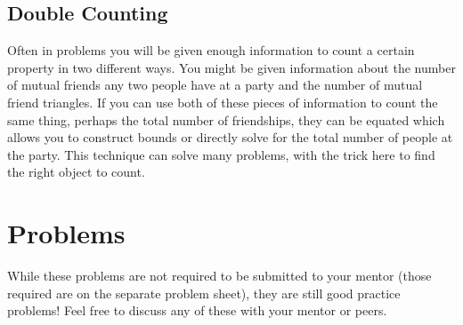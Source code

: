 \documentclass[12pt]{article}
\begin{document}
\subsection{Double Counting}
Often in problems you will be given enough information to count a certain property in two different ways. You might be given information about the number of mutual friends any two people have at a party and the number of mutual friend triangles. If you can use both of these pieces of information to count the same thing, perhaps the total number of friendships, they can be equated which allows you to construct bounds or directly solve for the total number of people at the party. This technique can solve many problems, with the trick here to find the right object to count. 
\section{Problems}
While these problems are not required to be submitted to your mentor (those required are on the separate problem sheet), they are still good practice problems! Feel free to discuss any of these with your mentor or peers.
\end{document}
